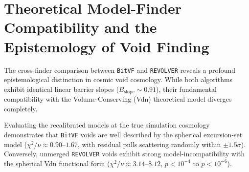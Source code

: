 \documentclass[12pt]{report}
\begin{document}
\section{Theoretical Model-Finder Compatibility and the Epistemology of Void Finding}
\label{sec:discussion_model_compatibility}

The cross-finder comparison between \texttt{BitVF} and \texttt{REVOLVER} reveals a profound epistemological distinction in cosmic void cosmology. While both algorithms exhibit identical linear barrier slopes ($B_{\mathrm{slope}} \sim 0.91$), their fundamental compatibility with the Volume-Conserving (Vdn) theoretical model diverges completely.

Evaluating the recalibrated models at the true simulation cosmology demonstrates that \texttt{BitVF} voids are well described by the spherical excursion-set model ($\chi^2/\nu \approx 0.90$--$1.67$, with residual pulls scattering randomly within $\pm 1.5\sigma$). Conversely, unmerged \texttt{REVOLVER} voids exhibit strong model-incompatibility with the spherical Vdn functional form ($\chi^2/\nu \approx 3.14$--$8.12$, $p < 10^{-4}$ to $p < 10^{-6}$).
\end{document}
